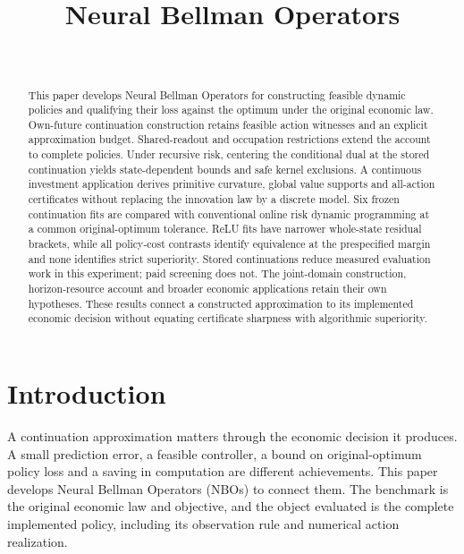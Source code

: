 \documentclass[ecta,nameyear,draft]{econsocart}
\begin{document}
\begin{frontmatter}
\title{Neural Bellman Operators}
\begin{aug}
\author[id=au1,addressref={add1}]{~}
\address[id=add1]{Peking University}
\end{aug}
\begin{abstract}
This paper develops Neural Bellman Operators for constructing feasible dynamic policies and qualifying their loss against the optimum under the original economic law. Own-future continuation construction retains feasible action witnesses and an explicit approximation budget. Shared-readout and occupation restrictions extend the account to complete policies. Under recursive risk, centering the conditional dual at the stored continuation yields state-dependent bounds and safe kernel exclusions. A continuous investment application derives primitive curvature, global value supports and all-action certificates without replacing the innovation law by a discrete model. Six frozen continuation fits are compared with conventional online risk dynamic programming at a common original-optimum tolerance. ReLU fits have narrower whole-state residual brackets, while all policy-cost contrasts identify equivalence at the prespecified margin and none identifies strict superiority. Stored continuations reduce measured evaluation work in this experiment; paid screening does not. The joint-domain construction, horizon-resource account and broader economic applications retain their own hypotheses. These results connect a constructed approximation to its implemented economic decision without equating certificate sharpness with algorithmic superiority.
\end{abstract}
\begin{keyword}
\end{keyword}
\end{frontmatter}
\section{Introduction}\label{sec:introduction65}
A continuation approximation matters through the economic decision it produces. A small prediction error, a feasible controller, a bound on original-optimum policy loss and a saving in computation are different achievements. This paper develops Neural Bellman Operators (NBOs) to connect them. The benchmark is the original economic law and objective, and the object evaluated is the complete implemented policy, including its observation rule and numerical action realization.
\end{document}
